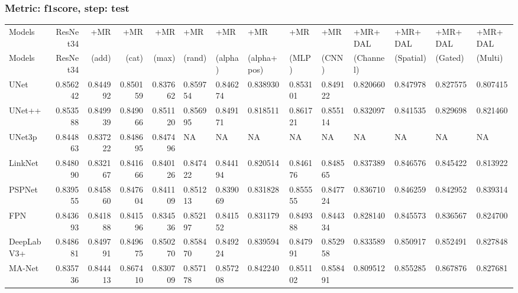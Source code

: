 \documentclass{article}
\begin{document}
\subsubsection{Metric: f1score, step: test}
\begin{tabular}{lrrrrlllllllll}
\toprule
Models & ResNet34 & +MR  & +MR  & +MR  & +MR  & +MR  & +MR  & +MR  & +MR  & +MR+DAL & +MR+DAL & +MR+DAL & +MR+DAL \\
Models & ResNet34 &  (add) &  (cat) &  (max) &  (rand) &  (alpha) &  (alpha+pos) &  (MLP) &  (CNN) & (Channel) & (Spatial) & (Gated) & (Multi) \\
\midrule
UNet & 0.856242 & 0.844992 & 0.850159 & 0.837662 & 0.859754 & 0.846274 & 0.838930 & 0.853101 & 0.849122 & 0.820660 & 0.847978 & 0.827575 & 0.807415 \\
UNet++ & 0.853588 & 0.849939 & 0.849066 & 0.851120 & 0.856995 & 0.849171 & 0.818511 & 0.861721 & 0.855114 & 0.832097 & 0.841535 & 0.829698 & 0.821460 \\
UNet3p & 0.844863 & 0.837222 & 0.848695 & 0.847496 & NA & NA & NA & NA & NA & NA & NA & NA & NA \\
LinkNet & 0.848090 & 0.832167 & 0.841666 & 0.840126 & 0.847422 & 0.844194 & 0.820514 & 0.846176 & 0.848565 & 0.837389 & 0.846576 & 0.845422 & 0.813922 \\
PSPNet & 0.839555 & 0.845860 & 0.847604 & 0.841109 & 0.851213 & 0.839069 & 0.831828 & 0.855555 & 0.847724 & 0.836710 & 0.846259 & 0.842952 & 0.839314 \\
FPN & 0.843693 & 0.841888 & 0.841596 & 0.834536 & 0.852197 & 0.841552 & 0.831179 & 0.849388 & 0.844334 & 0.828140 & 0.845573 & 0.836567 & 0.824700 \\
DeepLabV3+ & 0.848681 & 0.849791 & 0.849675 & 0.850270 & 0.858470 & 0.849224 & 0.839594 & 0.847991 & 0.852958 & 0.833589 & 0.850917 & 0.852491 & 0.827848 \\
MA-Net & 0.835736 & 0.844413 & 0.867410 & 0.830709 & 0.857178 & 0.857208 & 0.842240 & 0.851102 & 0.858491 & 0.809512 & 0.855285 & 0.867876 & 0.827681 \\
\bottomrule
\end{tabular}
\end{document}

